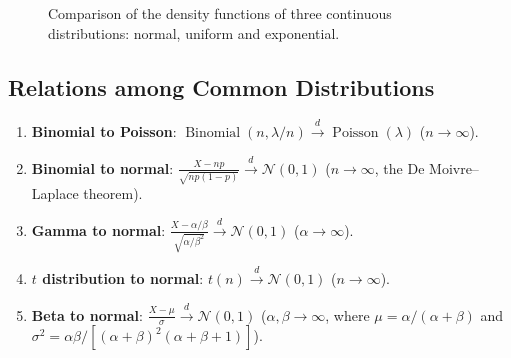 \begin{figure}[htbp]
\centering
{}
\caption{Comparison of the density functions of three continuous distributions: normal, uniform and exponential.}
\label{fig:continuous_pdf}
\end{figure}

\subsection{Relations among Common Distributions}

\begin{proposition}\label{prop:distribution_relations}
\begin{enumerate}[label=(\roman*)]
    \item \textbf{Binomial to Poisson}: $\operatorname{Binomial}(n, \lambda/n) \xrightarrow{d} \operatorname{Poisson}(\lambda)$ ($n \to \infty$).
    \item \textbf{Binomial to normal}: $\frac{X - np}{\sqrt{np(1-p)}} \xrightarrow{d} \mathcal{N}(0,1)$ ($n \to \infty$, the De Moivre--Laplace theorem).
    \item \textbf{Gamma to normal}: $\frac{X - \alpha/\beta}{\sqrt{\alpha/\beta^2}} \xrightarrow{d} \mathcal{N}(0,1)$ ($\alpha \to \infty$).
    \item \textbf{$t$ distribution to normal}: $t(n) \xrightarrow{d} \mathcal{N}(0,1)$ ($n \to \infty$).
    \item \textbf{Beta to normal}: $\frac{X - \mu}{\sigma} \xrightarrow{d} \mathcal{N}(0,1)$ ($\alpha, \beta \to \infty$, where $\mu = \alpha/(\alpha+\beta)$ and $\sigma^2 = \alpha\beta/[(\alpha+\beta)^2(\alpha+\beta+1)]$).
\end{enumerate}
\end{proposition}

